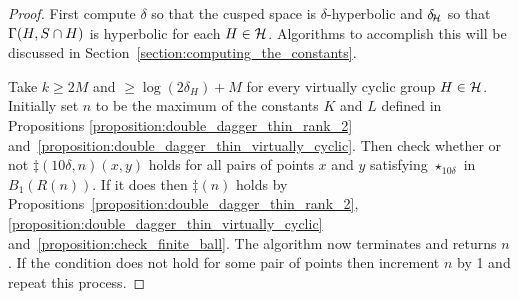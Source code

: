 \begin{proof}
  First compute $\delta$ so that the cusped space is $\delta$-hyperbolic and $\delta\kern-2pt_{\mathcal{H}}$ so that $\operatorname{\Gamma}(H, S \cap H)$ is hyperbolic for each $H \in \mathcal{H}$.
  Algorithms to accomplish this will be discussed in Section~\ref{section:computing_the_constants}.

  Take $k \geq 2M$ and $\geq \log(2\delta_H) + M$ for every virtually cyclic group $H \in \mathcal{H}$.
  Initially set $n$ to be the maximum of the constants $K$ and $L$ defined in Propositions \ref{proposition:double_dagger_thin_rank_2} and~\ref{proposition:double_dagger_thin_virtually_cyclic}.
  Then check whether or not $\ddag(10\delta,n)(x,y)$ holds for all pairs of points $x$ and $y$ satisfying $\star_{10\delta}$ in $B_1(R(n))$.
  If it does then $\ddag(n)$ holds by Propositions~\ref{proposition:double_dagger_thin_rank_2}, \ref{proposition:double_dagger_thin_virtually_cyclic} and~\ref{proposition:check_finite_ball}.
  The algorithm now terminates and returns $n$.
  If the condition does not hold for some pair of points then increment $n$ by 1 and repeat this process.
\end{proof}


